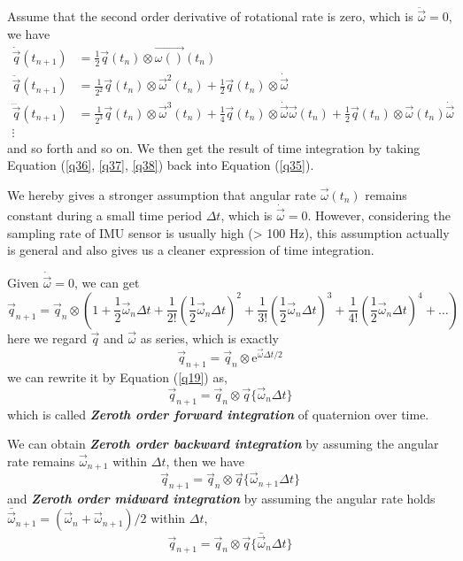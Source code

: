 Assume that the second order derivative of rotational rate is zero, which is $\ddot{\vec{\omega}} = 0$, we have
\begin{align} 
	\label{q36} 
	\dot{\vec{q}}(t_{n+1}) &= \frac{1}{2}\vec{q}(t_{n}) \otimes \vec{\omega()}(t_{n}) \\
	\label{q37} 
	\ddot{\vec{q}}(t_{n+1}) &= \frac{1}{2^2}\vec{q}(t_{n}) \otimes \vec{\omega}^2(t_{n})+\frac{1}{2}\vec{q}(t_{n}) \otimes \dot{\vec{\omega}} \\
	\label{q38} 
	\dddot{\vec{q}}(t_{n+1}) &= \frac{1}{2^3}\vec{q}(t_{n}) \otimes \vec{\omega}^3(t_{n}) + \frac{1}{4}\vec{q}(t_{n}) \otimes \dot{\vec{\omega}}\vec{\omega}(t_{n}) + \frac{1}{2}\vec{q}(t_{n}) \otimes \vec{\omega}(t_{n})\dot{\vec{\omega}} \\
	 \vdots & \nonumber 
\end{align}
and so forth and so on. We then get the result of time integration by taking Equation (\ref{q36}, \ref{q37}, \ref{q38}) back into Equation (\ref{q35}).

We hereby gives a stronger assumption that angular rate $\vec{\omega}(t_{n})$ remains constant during a small time period $\Delta{t}$, which is $\dot{\vec{\omega}} = 0$. However, considering the sampling rate of IMU sensor is usually high (> 100 Hz), this assumption actually is general and also gives us a cleaner expression of time integration. 

Given $\dot{\vec{\omega}} = 0$, we can get
\begin{equation} \label{q39} 
	\vec{q}_{n+1} = \vec{q}_n \otimes (1+\frac{1}{2}\vec{\omega}_n\Delta{t}+\frac{1}{2!}(\frac{1}{2}\vec{\omega}_n\Delta{t})^2+\frac{1}{3!}(\frac{1}{2}\vec{\omega}_n\Delta{t})^3+\frac{1}{4!}(\frac{1}{2}\vec{\omega}_n\Delta{t})^4+\dots)
\end{equation}
here we regard $\vec{q}$ and $\vec{\omega}$ as series, which is exactly
\begin{equation} \label{q40} 
	\vec{q}_{n+1} = \vec{q}_n \otimes \mathrm{e}^{\vec{\omega}\Delta{t}/2}
\end{equation}
we can rewrite it by Equation (\ref{q19}) as,
\begin{equation} \label{q41} 
	\vec{q}_{n+1} = \vec{q}_n \otimes \vec{q}\{ \vec{\omega}_n\Delta{t} \}
\end{equation}
which is called \textbf{\textit{Zeroth order forward integration}} of quaternion over time.

We can obtain \textbf{\textit{Zeroth order backward integration}} by assuming the angular rate remains $\vec{\omega}_{n+1}$ within $\Delta{t}$, then we have
\begin{equation} \label{q42} 
	\vec{q}_{n+1} = \vec{q}_n \otimes \vec{q}\{ \vec{\omega}_{n+1}\Delta{t} \}
\end{equation}
and \textbf{\textit{Zeroth order midward integration}}  by assuming the angular rate holds $\bar{\vec{\omega}}_{n+1} =(\vec{\omega}_{n}+ \vec{\omega}_{n+1})/2$ within $\Delta{t}$,
\begin{equation} \label{q43} 
	\vec{q}_{n+1} = \vec{q}_n \otimes \vec{q}\{ \bar{\vec{\omega}}_{n}\Delta{t} \}
\end{equation}

